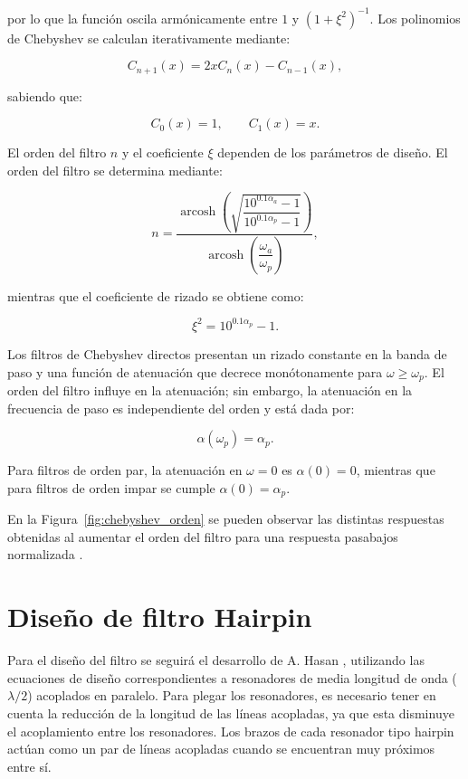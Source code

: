 por lo que la función oscila armónicamente entre $1$ y $(1+\xi^2)^{-1}$. Los polinomios de Chebyshev se calculan iterativamente mediante:

\begin{equation}
C_{n+1}(x) = 2x C_n(x) - C_{n-1}(x),
\end{equation}

sabiendo que:

\begin{equation}
C_0(x) = 1,
\qquad
C_1(x) = x.
\end{equation}

El orden del filtro $n$ y el coeficiente $\xi$ dependen de los parámetros de diseño. El orden del filtro se determina mediante:

\begin{equation}
n =
\frac{
\operatorname{arcosh}
\left(
\sqrt{\dfrac{10^{0.1\alpha_a}-1}
{10^{0.1\alpha_p}-1}}
\right)
}{
\operatorname{arcosh}\left(\dfrac{\omega_a}{\omega_p}\right)
},
\label{eq:orden_chebyshev}
\end{equation}

mientras que el coeficiente de rizado se obtiene como:

\begin{equation}
\xi^2 = 10^{0.1\alpha_p} - 1.
\label{eq:xi_chebyshev}
\end{equation}

Los filtros de Chebyshev directos presentan un rizado constante en la banda de paso y una función de atenuación que decrece monótonamente para $\omega \geq \omega_p$. El orden del filtro influye en la atenuación; sin embargo, la atenuación en la frecuencia de paso es independiente del orden y está dada por:

\begin{equation}
\alpha(\omega_p) = \alpha_p.
\end{equation}

Para filtros de orden par, la atenuación en $\omega=0$ es $\alpha(0)=0$, mientras que para filtros de orden impar se cumple $\alpha(0)=\alpha_p$.

En la Figura~\ref{fig:chebyshev_orden} se pueden observar las distintas respuestas obtenidas al aumentar el orden del filtro para una respuesta pasabajos normalizada \cite{CervettoDadam2019}.

\section{Diseño de filtro Hairpin}
Para el diseño del filtro se seguirá el desarrollo de A. Hasan \cite{A Hasan}, utilizando las ecuaciones de diseño correspondientes a resonadores de media longitud de onda ($\lambda/2$) acoplados en paralelo. Para plegar los resonadores, es necesario tener en cuenta la reducción de la longitud de las líneas acopladas, ya que esta disminuye el acoplamiento entre los resonadores. Los brazos de cada resonador tipo hairpin actúan como un par de líneas acopladas cuando se encuentran muy próximos entre sí.

